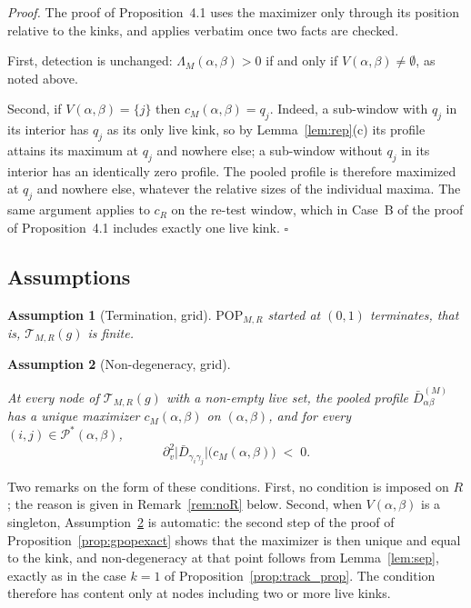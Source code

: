 \documentclass[12pt, a4paper]{article}
\newcommand{\qed}{\hfill$\square$}
\newenvironment{proof}[1][Proof]{\par\noindent\textit{#1.}\space}{\qed\par\medskip}
\newtheorem{assumption}{Assumption}[section]
\newcommand{\proppop}{Proposition~4.1}
\begin{document}
\begin{proof}
The proof of \proppop{} uses the maximizer only through its position relative
to the kinks, and applies verbatim once two facts are checked.

First, detection is unchanged: $\Lambda_M(\alpha,\beta) > 0$ if and only if
$V(\alpha,\beta) \ne \emptyset$, as noted above.

Second, if $V(\alpha,\beta) = \{j\}$ then $c_M(\alpha,\beta) = q_j$.
Indeed, a sub-window with $q_j$ in its interior has $q_j$ as its only live
kink, so by Lemma~\ref{lem:rep}(c) its profile attains its maximum at $q_j$ and
nowhere else; a sub-window without $q_j$ in its interior has an identically
zero profile. The pooled profile is therefore maximized at $q_j$ and nowhere
else, whatever the relative sizes of the individual maxima. The same argument
applies to $c_R$ on the re-test window, which in Case~B of the proof of
\proppop{} includes exactly one live kink.
\end{proof}

\subsection{Assumptions}
\label{sup:gridass}

\begin{assumption}[Termination, grid]
\label{ass:gterm}
$\mathrm{POP}_{M,R}$ started at $(0,1)$ terminates, that is,
$\mathcal{T}_{M,R}(g)$ is finite.
\end{assumption}

\begin{assumption}[Non-degeneracy, grid]
\label{ass:gnondeg}
\mbox{}\par
At every node of $\mathcal{T}_{M,R}(g)$ with a non-empty live set, the pooled profile
$\bar D^{(M)}_{\alpha\beta}$ has a unique
maximizer $c_M(\alpha,\beta)$ on $(\alpha,\beta)$, and for every
$(i,j)\in\mathcal{P}^*(\alpha,\beta)$,
\[
\partial_v^2 \big| \bar D_{\gamma_i\gamma_j} \big| \big( c_M(\alpha,\beta)
\big) \;<\; 0 .
\]
\end{assumption}

Two remarks on the form of these conditions. First, no condition is imposed on
$R$; the reason is given in Remark~\ref{rem:noR} below. Second, when
$V(\alpha,\beta)$ is a singleton, Assumption~\ref{ass:gnondeg} is automatic:
the second step of the proof of Proposition~\ref{prop:gpopexact} shows that the
maximizer is then unique and equal to the kink, and non-degeneracy at that
point follows from Lemma~\ref{lem:sep}, exactly as in the case $k=1$ of
Proposition~\ref{prop:track_prop}. The condition therefore has content only at
nodes including two or more live kinks.
\end{document}
